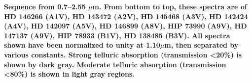 {\bf Sequence from 0.7–2.55 $\mu$m. From bottom to top, these spectra are of HD 146266 (A1V), HD 143472 (A2V), HD 145468 (A3V), HD 142424 (A4V), HD 142097 (A5V), HD 146899 (A8V), HIP 73990 (A9V),
HD 147137 (A9V), HIP 78933 (B1V), HD 138485 (B3V).  
All spectra shown have been normalized to unity at 1.10$\mu$m, then separated by various constants.  Strong telluric absorption (transmission <20\%) is shown by dark gray.  Moderate telluric absorption (transmission <80\%) is shown in light gray regions.\label{fig:stack-plot-a}}
